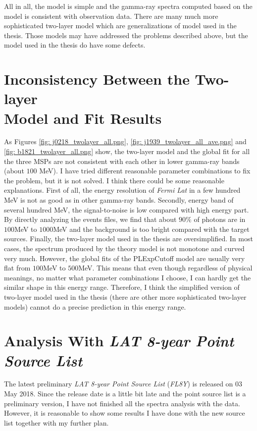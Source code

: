 \documentclass[12pt]{report}
\begin{document}
        All in all, the model is simple and the gamma-ray spectra computed based on the model 
        is consistent with observation data. There are many much more sophisticated 
        two-layer model which are generalizations of model used in the thesis. Those models 
        may have addressed the problems described above, but the model used in the thesis 
        do have some defects. 
    
    \section{Inconsistency Between the Two-layer \\ Model and Fit Results}
      As Figures \ref{fig: j0218_twolayer_all.png}, \ref{fig: j1939_twolayer_all_ave.png} and 
      \ref{fig: b1821_twolayer_all.png} show, the two-layer model and the global fit for all 
      the three MSPs are not consistent with each other in lower gamma-ray bands (about $100$ 
      MeV). I have tried different reasonable parameter combinations to fix the problem, but 
      it is not solved. I think there could be some reasonable explanations. First of all, 
      the energy resolution of \textit{Fermi Lat} in a few hundred MeV is not as good as in 
      other gamma-ray bands. Secondly, energy band of several hundred MeV, the signal-to-noise 
      is low compared with high energy part. By directly analyzing the events files, we find that 
      about $90\%$ of photons are in $100$MeV to $1000$MeV and the background is too bright 
      compared with the target sources. Finally, the two-layer model used in the thesis are 
      oversimplified. In most cases, the spectrum produced by the theory model is not monotone and 
      curved very much. However, the global fits of the PLExpCutoff model are usually very 
      flat from $100$MeV to $500$MeV. This means that even though regardless of physical meanings,
      no matter what parameter combinations I choose, I can hardly get the similar shape in this 
      energy range. Therefore, I think the simplified version of two-layer model used in the 
      thesis (there are other more sophisticated two-layer models) cannot do a precise prediction 
      in this energy range. 
      

    \section{Analysis With \textit{LAT 8-year Point Source List}}
      The latest preliminary \textit{LAT 8-year Point Source List} (\textit{FL8Y}) is released 
      on 03 May 2018. Since the release date is a little bit late and the point source list is a 
      preliminary version, I have not finished all the spectra analysis with the data. However, 
      it is reasonable to show some results I have done with the new source list together with my
      further plan.
\end{document}
